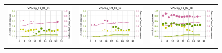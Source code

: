 \begin{figure}
\begin{tabular}{cc|c}
\includegraphics[width=\subplotwidth]{./figures/csp_spoc_incommon/bubble_csp_spoc_incommon_VPpcag_d2_nolegend}& \includegraphics[width=\subplotwidth]{./figures/csp_spoc_incommon/bubble_csp_spoc_incommon_VPpcag_d3_nolegend}& \includegraphics[width=\subplotwidth]{./figures/csp_spoc_incommon/bubble_csp_spoc_incommon_VPpcag_d4_nolegend}\\

\end{tabular}
\end{figure}
